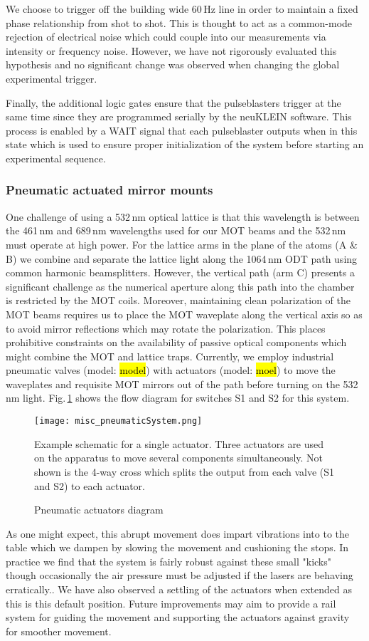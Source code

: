 We choose to trigger off the building wide 60\,Hz line in order to maintain a fixed phase relationship from shot to shot.
This is thought to act as a common-mode rejection of electrical noise which could couple into our measurements via intensity or frequency noise.
However, we have not rigorously evaluated this hypothesis and no significant change was observed when changing the global experimental trigger.

Finally, the additional logic gates ensure that the pulseblasters trigger at the same time since they are programmed serially by the neuKLEIN software.
This process is enabled by a WAIT signal that each pulseblaster outputs when in this state which is used to ensure proper initialization of the system before starting an experimental sequence.

\subsubsection{Pneumatic actuated mirror mounts}
One challenge of using a 532\,nm optical lattice is that this wavelength is between the 461\,nm and 689\,nm wavelengths used for our MOT beams and the 532\,nm must operate at high power.
For the lattice arms in the plane of the atoms (A \& B) we combine and separate the lattice light along the 1064\,nm ODT path using common harmonic beamsplitters.
However, the vertical path (arm C) presents a significant challenge as the numerical aperture along this path into the chamber is restricted by the MOT coils.
Moreover, maintaining clean polarization of the MOT beams requires us to place the MOT waveplate along the vertical axis so as to avoid mirror reflections which may rotate the polarization.
This places prohibitive constraints on the availability of passive optical components which might combine the MOT and lattice traps.
Currently, we employ industrial pneumatic valves (model: \hl{model}) with actuators (model: \hl{moel}) to move the waveplates and requisite MOT mirrors out of the path before turning on the 532\,nm light.
Fig.\,\ref{fig:pnuSys} shows the flow diagram for switches S1 and S2 for this system.
	\begin{figure}
		\centerline{
		\texttt{[image: misc\_pneumaticSystem.png]}}
		\caption{Pneumatic actuators diagram}{Example schematic for a single actuator. Three actuators are used on the apparatus to move several components simultaneously. Not shown is the 4-way cross which splits the output from each valve (S1 and S2) to each actuator.}
		\label{fig:pnuSys}
	\end{figure}
As one might expect, this abrupt movement does impart vibrations into to the table which we dampen by slowing the movement and cushioning the stops.
In practice we find that the system is fairly robust against these small "kicks" though occasionally the air pressure must be adjusted if the lasers are behaving erratically..
We have also observed a settling of the actuators when extended as this is this default position.
Future improvements may aim to provide a rail system for guiding the movement and supporting the actuators against gravity for smoother movement.